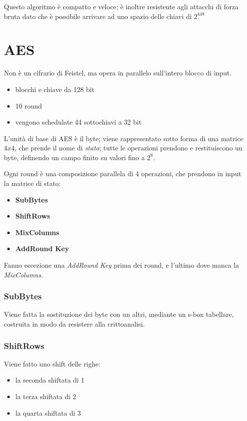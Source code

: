 \noindent Questo algoritmo è compatto e veloce; è inoltre resistente agli attacchi di forza 
bruta dato che è possibile arrivare ad uno spazio delle chiavi di $2^{448}$


\section{AES}

Non è un cifrario di Feistel, ma opera in parallelo sull'intero blocco 
di input.
\begin{itemize}
    \item blocchi e chiave da 128 bit 
    \item 10 round 
    \item vengono schedulate 44 sottochiavi a 32 bit 
\end{itemize}

\noindent L'unità di base di AES è il byte; viene rappresentato sotto forma di una matrice 
$4x4$, che prende il nome di \textit{stato}; tutte le operazioni prendono e restituiscono un byte, definendo 
un campo finito su valori fino a $2^8$.

\noindent Ogni round è una composizione parallela di 4 operazioni, che prendono 
in input la matrice di stato:
\begin{itemize}
    \item \textbf{SubBytes}
    \item \textbf{ShiftRows}
    \item \textbf{MixColumns}
    \item \textbf{AddRound Key}
\end{itemize}

\noindent Fanno eccezione una \textit{AddRound Key} prima dei round, e l'ultimo 
dove manca la \textit{MixColumns}.



\subsubsection{SubBytes}

Viene fatta la sostituzione dei byte con un altri, mediante un s-box tabellare, 
costruita in modo da resistere alla crittoanalisi.

\subsubsection{ShiftRows}

Viene fatto uno shift delle righe:
\begin{itemize}
    \item la seconda shiftata di 1 
    \item la terza shiftata di 2 
    \item la quarta shiftata di 3
\end{itemize}


